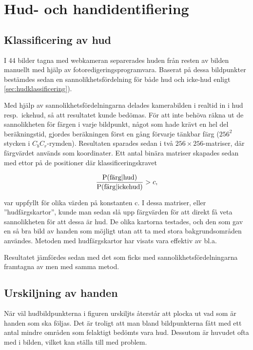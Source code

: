 \section{Hud- och handidentifiering}

\subsection{Klassificering av hud}
I 44 bilder tagna med webkameran separerades huden från resten av
bilden manuellt med hjälp av fotoredigeringsprogramvara. Baserat på
dessa bildpunkter bestämdes sedan en sannolikhetsfördelning för både hud
och icke-hud enligt \ref{sec:hudklassificering}). 

Med hjälp av
sannolikhetsfördelningarna delades kamerabilden i realtid in i hud
resp.~ickehud, så att resultatet kunde bedömas. För att inte behöva
räkna ut de sannolikheten för färgen i varje bildpunkt,
något som hade krävt en hel del beräkningstid, gjordes beräkningen
först en gång förvarje tänkbar färg ($256^2$ stycken i
$C_bC_r$-rymden). Resultaten sparades
sedan i två $256\times256$-matriser, där färgvärdet används som
koordinater. Ett antal binära matriser skapades sedan med ettor på de
positioner där klassificeringskravet 

\begin{equation*}
	\frac{\mathrm{P}(\textrm{färg}|\textrm{hud})}{\mathrm{P}(\textrm{färg}|\textrm{ickehud})} > c,
\end{equation*}

var uppfyllt för olika värden på konstanten c. I dessa matriser, eller
''hudfärgskartor'', kunde man sedan slå upp
färgvärden för att direkt få veta sannolikheten för att dessa är
hud. De olika kartorna testades, och den som gav en så bra bild av
handen som möjligt utan att ta med stora bakgrundsområden användes.
Metoden med hudfärgskartor har visats vara effektiv av bl.a.~


Resultatet jämfördes sedan med det som ficks med
sannolikhetsfördelningarna framtagna av  men
med samma metod.

\subsection{Urskiljning av handen}\label{sec:metod_hud:urskiljning}

När väl hudbildpunkterna i figuren urskiljts återstår att plocka ut
vad som är handen som ska följas. Det är troligt att man bland
bildpunkterna fått med ett antal mindre områden som felaktigt bedömts vara
hud. Dessutom är huvudet ofta med i bilden, vilket kan ställa till med
problem. 

